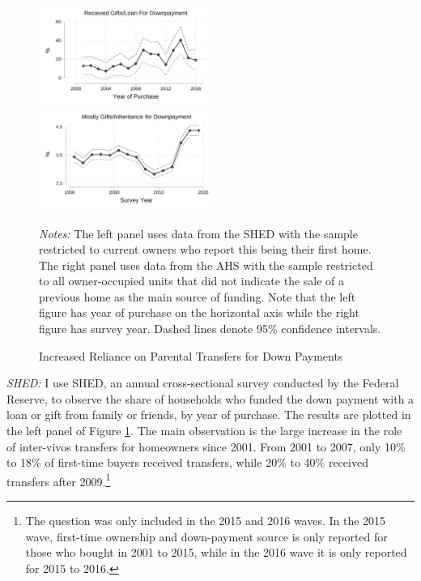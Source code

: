 \documentclass[12pt]{article}
\begin{document}
\begin{figure}
	\caption{Increased Reliance on Parental Transfers for Down Payments}\label{fig:motivation}
	\includegraphics[width=0.5\textwidth]{../tabfig/descr/SHED_gift_scatter_SE_paper}%
	\includegraphics[width=0.5\textwidth]{../tabfig/descr/AHS_majorsourcedown_surveyyear_paper}%
	
	 {\begin{footnotesize} \textit{Notes:} The left panel uses data from the SHED with the sample restricted to current owners who report this being their first home. The right panel uses data from the AHS with the sample restricted to all owner-occupied units that did not indicate the sale of a previous home as the main source of funding. Note that the left figure has year of purchase on the horizontal axis while the right figure has survey year. Dashed lines denote 95\% confidence intervals.\end{footnotesize}}
\end{figure}

\textit{SHED:} I use SHED, an annual cross-sectional survey conducted by the Federal Reserve, to observe the share of households who funded the down payment with a loan or gift from family or friends, by year of purchase. The results are plotted in the left panel of Figure \ref{fig:motivation}. The main observation is the large increase in the role of inter-vivos transfers for homeowners since 2001. From 2001 to 2007, only 10\% to 18\% of first-time buyers received transfers, while 20\% to 40\% received transfers after 2009.\footnote{The question was only included in the 2015 and 2016 waves. In the 2015 wave, first-time ownership and down-payment source is only reported for those who bought in 2001 to 2015, while in the 2016 wave it is only reported for 2015 to 2016. } 
\end{document}
